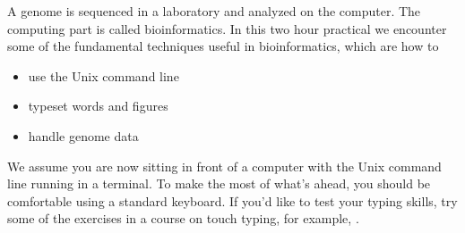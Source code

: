 A genome is sequenced in a laboratory and analyzed on the
computer. The computing part is called bioinformatics. In this two
hour practical we encounter some of the fundamental techniques useful
in bioinformatics, which are how to
\begin{itemize}
\item use the Unix command line
\item typeset words and figures
\item handle genome data
\end{itemize}
We assume you are now sitting in front of a computer with the Unix
command line running in a terminal. To make the most of what's ahead,
you should be comfortable using a standard keyboard. If you'd like to
test your typing skills, try some of the exercises in a course on
touch typing, for example, .
